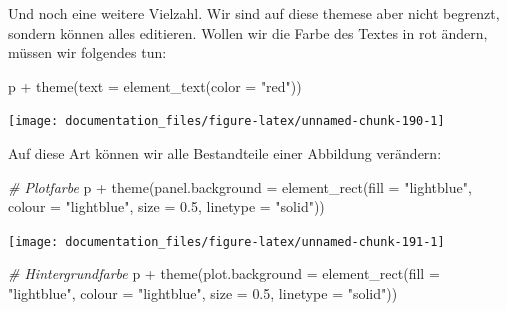\documentclass[
]{article}
\newenvironment{Shaded}{\begin{snugshade}}{\end{snugshade}}
\newcommand{\AttributeTok}[1]{\textcolor[rgb]{0.77,0.63,0.00}{#1}}
\newcommand{\CommentTok}[1]{\textcolor[rgb]{0.56,0.35,0.01}{\textit{#1}}}
\newcommand{\FloatTok}[1]{\textcolor[rgb]{0.00,0.00,0.81}{#1}}
\newcommand{\FunctionTok}[1]{\textcolor[rgb]{0.00,0.00,0.00}{#1}}
\newcommand{\NormalTok}[1]{#1}
\newcommand{\SpecialCharTok}[1]{\textcolor[rgb]{0.00,0.00,0.00}{#1}}
\newcommand{\StringTok}[1]{\textcolor[rgb]{0.31,0.60,0.02}{#1}}
\begin{document}
Und noch eine weitere Vielzahl. Wir sind auf diese themese aber nicht begrenzt, sondern können alles editieren. Wollen wir die Farbe des Textes in rot ändern, müssen wir folgendes tun:

\begin{Shaded}
\begin{Highlighting}[]
\NormalTok{p }\SpecialCharTok{+} \FunctionTok{theme}\NormalTok{(}\AttributeTok{text =} \FunctionTok{element\_text}\NormalTok{(}\AttributeTok{color =} \StringTok{"red"}\NormalTok{))}
\end{Highlighting}
\end{Shaded}

\begin{center}\texttt{[image: documentation\_files/figure-latex/unnamed-chunk-190-1]} \end{center}

Auf diese Art können wir alle Bestandteile einer Abbildung verändern:

\begin{Shaded}
\begin{Highlighting}[]
\CommentTok{\# Plotfarbe}
\NormalTok{p }\SpecialCharTok{+} \FunctionTok{theme}\NormalTok{(}\AttributeTok{panel.background =} \FunctionTok{element\_rect}\NormalTok{(}\AttributeTok{fill =} \StringTok{"lightblue"}\NormalTok{,}
                                \AttributeTok{colour =} \StringTok{"lightblue"}\NormalTok{,}
                                \AttributeTok{size =} \FloatTok{0.5}\NormalTok{, }\AttributeTok{linetype =} \StringTok{"solid"}\NormalTok{))}
\end{Highlighting}
\end{Shaded}

\begin{center}\texttt{[image: documentation\_files/figure-latex/unnamed-chunk-191-1]} \end{center}

\begin{Shaded}
\begin{Highlighting}[]

\CommentTok{\# Hintergrundfarbe }
\NormalTok{p }\SpecialCharTok{+} \FunctionTok{theme}\NormalTok{(}\AttributeTok{plot.background =} \FunctionTok{element\_rect}\NormalTok{(}\AttributeTok{fill =} \StringTok{"lightblue"}\NormalTok{,}
                                \AttributeTok{colour =} \StringTok{"lightblue"}\NormalTok{,}
                                \AttributeTok{size =} \FloatTok{0.5}\NormalTok{, }\AttributeTok{linetype =} \StringTok{"solid"}\NormalTok{))}
\end{Highlighting}
\end{Shaded}
\end{document}
